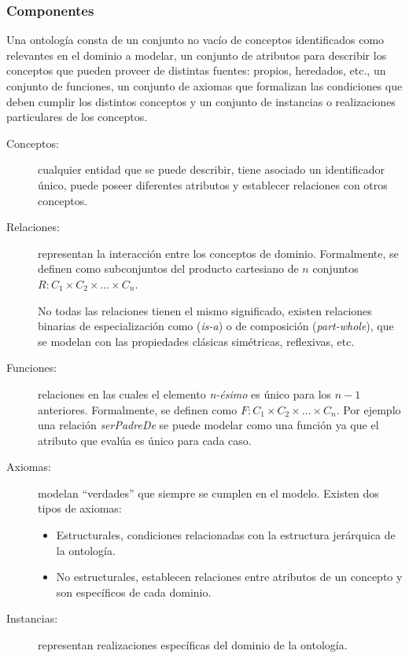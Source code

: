 \subsubsection{Componentes}
Una ontología consta de un conjunto no vacío de conceptos identificados como
relevantes en el dominio a modelar, un conjunto de atributos para describir los
conceptos que pueden proveer de distintas fuentes: propios, heredados, etc., un
conjunto de funciones, un conjunto de axiomas que formalizan las condiciones que
deben cumplir los distintos conceptos y un conjunto de instancias o
realizaciones particulares de los conceptos.

\begin{description}
\item[Conceptos:] cualquier entidad que se puede describir, tiene asociado un
identificador único, puede poseer diferentes atributos y establecer relaciones
con otros conceptos.
\item[Relaciones:] representan la interacción entre los conceptos de dominio.
Formalmente, se definen como subconjuntos del producto cartesiano de $n$
conjuntos $R: C_1 \times C_2 \times \ldots \times C_n$.

No todas las relaciones tienen el mismo significado, existen relaciones binarias
de especialización como (\textit{is-a}) o de composición (\textit{part-whole}),
que se modelan con las propiedades clásicas simétricas, reflexivas, etc.

\item[Funciones:]relaciones en las cuales el elemento \textit{n-ésimo} es único para
los $n-1$ anteriores. Formalmente, se definen como $F:C_1 \times C_2 \times
\ldots \times C_n$. Por ejemplo una relación \textit{serPadreDe} se puede
modelar como una función ya que el atributo que evalúa es único para cada caso.

\item[Axiomas:] modelan ``verdades'' que siempre se cumplen en el modelo.
Existen dos tipos de axiomas:
\begin{itemize}
  \item Estructurales, condiciones relacionadas con la estructura jerárquica de
  la ontología. 
  \item No estructurales, establecen relaciones entre atributos de un concepto y
  son específicos de cada dominio.
\end{itemize}

\item[Instancias:] representan realizaciones específicas del dominio de la ontología.
\end{description}

